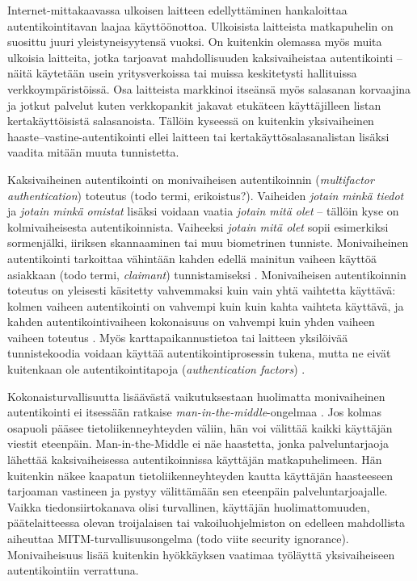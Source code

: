 \documentclass[finnish,gradu]{tktltiki}
\begin{document}
  Internet-mittakaavassa ulkoisen laitteen edellyttäminen hankaloittaa autentikointitavan laajaa käyttöönottoa. Ulkoisista laitteista matkapuhelin on suosittu juuri yleistyneisyytensä vuoksi. On kuitenkin olemassa myös muita ulkoisia laitteita, jotka tarjoavat mahdollisuuden kaksivaiheistaa autentikointi -- näitä käytetään usein yritysverkoissa tai muissa keskitetysti hallituissa verkkoympäristöissä. Osa laitteista markkinoi itseänsä myös salasanan korvaajina ja jotkut palvelut kuten verkkopankit jakavat etukäteen käyttäjilleen listan kertakäyttöisistä salasanoista. Tällöin kyseessä on kuitenkin yksivaiheinen haaste--vastine-autentikointi ellei laitteen tai kertakäyttösalasanalistan lisäksi vaadita mitään muuta tunnistetta.

  Kaksivaiheinen autentikointi on monivaiheisen autentikoinnin (\emph{multifactor authentication}) toteutus (todo termi, erikoistus?).
  Vaiheiden \emph{jotain minkä tiedot} ja \emph{jotain minkä omistat} lisäksi voidaan vaatia \emph{jotain mitä olet} -- tällöin kyse on kolmivaiheisesta autentikoinnista. Vaiheeksi \emph{jotain mitä olet} sopii esimerkiksi sormenjälki, iiriksen skannaaminen tai muu biometrinen tunniste. Monivaiheinen autentikointi tarkoittaa vähintään kahden edellä mainitun vaiheen käyttöä asiakkaan (todo termi, \emph{claimant}) tunnistamiseksi \cite{NIST_SP800-63-1}. Monivaiheisen autentikoinnin toteutus on yleisesti käsitetty vahvemmaksi kuin vain yhtä vaihtetta käyttävä: kolmen vaiheen autentikointi on vahvempi kuin kuin kahta vaihteta käyttävä, ja kahden autentikointivaiheen kokonaisuus on vahvempi kuin yhden vaiheen vaiheen toteutus \cite{NIST_SP800-63-1}. Myös karttapaikannustietoa tai laitteen yksilöivää tunnistekoodia voidaan käyttää autentikointiprosessin tukena, mutta ne eivät kuitenkaan ole autentikointitapoja (\emph{authentication factors}) \cite{NIST_SP800-63-1}.

  Kokonaisturvallisuutta lisäävästä vaikutuksestaan huolimatta monivaiheinen autentikointi ei itsessään ratkaise \emph{man-in-the-middle}-ongelmaa \cite{schneier_2factor_2005}. Jos kolmas osapuoli pääsee tietoliikenneyhteyden väliin, hän voi välittää kaikki käyttäjän viestit eteenpäin. Man-in-the-Middle ei näe haastetta, jonka palveluntarjaoja lähettää kaksivaiheisessa autentikoinnissa käyttäjän matkapuhelimeen. Hän kuitenkin näkee kaapatun tietoliikenneyhteyden kautta käyttäjän haasteeseen tarjoaman vastineen ja pystyy välittämään sen eteenpäin palveluntarjoajalle. Vaikka tiedonsiirtokanava olisi turvallinen, käyttäjän huolimattomuuden, päätelaitteessa olevan troijalaisen tai vakoiluohjelmiston on edelleen mahdollista aiheuttaa MITM-turvallisuusongelma (todo viite security ignorance). Monivaiheisuus lisää kuitenkin hyökkäyksen vaatimaa työläyttä yksivaiheiseen autentikointiin verrattuna.
\end{document}
